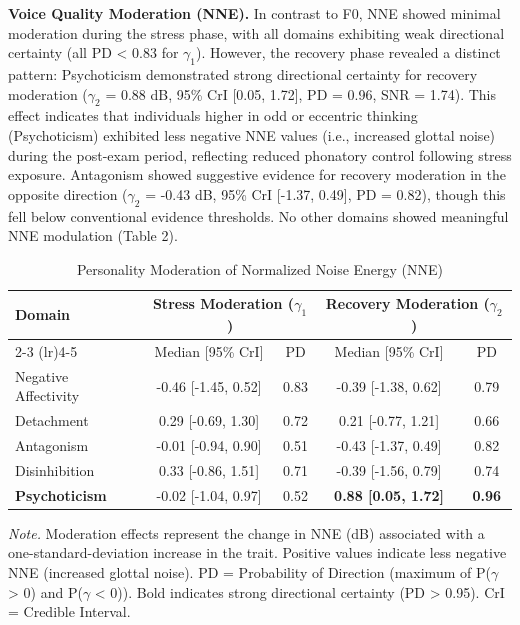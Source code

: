 \documentclass[
  english,
  man]{apa6}
\begin{document}
\textbf{Voice Quality Moderation (NNE).} In contrast to F0, NNE showed minimal moderation during the stress phase, with all domains exhibiting weak directional certainty (all PD \textless{} 0.83 for \(\gamma_1\)). However, the recovery phase revealed a distinct pattern: Psychoticism demonstrated strong directional certainty for recovery moderation (\(\gamma_2\) = 0.88 dB, 95\% CrI {[}0.05, 1.72{]}, PD = 0.96, SNR = 1.74). This effect indicates that individuals higher in odd or eccentric thinking (Psychoticism) exhibited less negative NNE values (i.e., increased glottal noise) during the post-exam period, reflecting reduced phonatory control following stress exposure. Antagonism showed suggestive evidence for recovery moderation in the opposite direction (\(\gamma_2\) = -0.43 dB, 95\% CrI {[}-1.37, 0.49{]}, PD = 0.82), though this fell below conventional evidence thresholds. No other domains showed meaningful NNE modulation (Table 2).

\begin{table}[h]
\caption{Personality Moderation of Normalized Noise Energy (NNE)}
\label{tab:nne-moderation}
\small
\begin{tabular}{lcccc}
\hline
\multirow{2}{*}{Domain} & \multicolumn{2}{c}{Stress Moderation ($\gamma_1$)} & \multicolumn{2}{c}{Recovery Moderation ($\gamma_2$)} \\
\cmidrule(lr){2-3} \cmidrule(lr){4-5}
 & Median [95\% CrI] & PD & Median [95\% CrI] & PD \\
\hline
Negative Affectivity & -0.46 [-1.45, 0.52] & 0.83 & -0.39 [-1.38, 0.62] & 0.79 \\
Detachment & 0.29 [-0.69, 1.30] & 0.72 & 0.21 [-0.77, 1.21] & 0.66 \\
Antagonism & -0.01 [-0.94, 0.90] & 0.51 & -0.43 [-1.37, 0.49] & 0.82 \\
Disinhibition & 0.33 [-0.86, 1.51] & 0.71 & -0.39 [-1.56, 0.79] & 0.74 \\
\textbf{Psychoticism} & -0.02 [-1.04, 0.97] & 0.52 & \textbf{0.88 [0.05, 1.72]} & \textbf{0.96} \\
\hline
\end{tabular}
\begin{tablenotes}
\small
\item \textit{Note.} Moderation effects represent the change in NNE (dB) associated with a one-standard-deviation increase in the trait. Positive values indicate less negative NNE (increased glottal noise). PD = Probability of Direction (maximum of P($\gamma$ > 0) and P($\gamma$ < 0)). Bold indicates strong directional certainty (PD > 0.95). CrI = Credible Interval.
\end{tablenotes}
\end{table}
\end{document}
